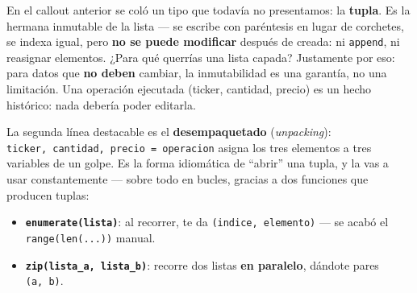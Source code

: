 \documentclass[
  spanish,
  letterpaper,
  DIV=11,
  numbers=noendperiod]{scrreprt}
\newenvironment{Shaded}{\begin{snugshade}}{\end{snugshade}}
\newcommand{\NormalTok}[1]{\textcolor[rgb]{0.00,0.23,0.31}{#1}}
\providecommand{\tightlist}{%
  \setlength{\itemsep}{0pt}\setlength{\parskip}{0pt}}
\begin{document}
En el callout anterior se coló un tipo que todavía no presentamos: la
\textbf{tupla}. Es la hermana inmutable de la lista --- se escribe con
paréntesis en lugar de corchetes, se indexa igual, pero \textbf{no se
puede modificar} después de creada: ni \texttt{append}, ni reasignar
elementos. ¿Para qué querrías una lista capada? Justamente por eso: para
datos que \textbf{no deben} cambiar, la inmutabilidad es una garantía,
no una limitación. Una operación ejecutada (ticker, cantidad, precio) es
un hecho histórico: nada debería poder editarla.

\begin{Shaded}
\end{Shaded}

La segunda línea destacable es el \textbf{desempaquetado}
(\emph{unpacking}): \texttt{ticker,\ cantidad,\ precio\ =\ operacion}
asigna los tres elementos a tres variables de un golpe. Es la forma
idiomática de ``abrir'' una tupla, y la vas a usar constantemente ---
sobre todo en bucles, gracias a dos funciones que producen tuplas:

\begin{itemize}
\tightlist
\item
  \textbf{\texttt{enumerate(lista)}}: al recorrer, te da
  \texttt{(indice,\ elemento)} --- se acabó el \texttt{range(len(...))}
  manual.
\item
  \textbf{\texttt{zip(lista\_a,\ lista\_b)}}: recorre dos listas
  \textbf{en paralelo}, dándote pares \texttt{(a,\ b)}.
\end{itemize}
\end{document}
